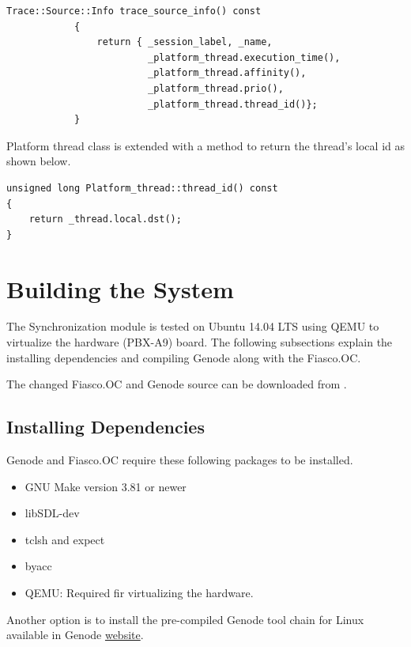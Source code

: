 \begin{lstlisting}[style=customcpp]
	Trace::Source::Info trace_source_info() const
			{
				return { _session_label, _name,
				         _platform_thread.execution_time(),
				         _platform_thread.affinity(),
						 _platform_thread.prio(),
						 _platform_thread.thread_id()};
			}
\end{lstlisting}


Platform thread class is extended with a method to return the thread's local id as shown below.

\begin{lstlisting}[style=customcpp]
unsigned long Platform_thread::thread_id() const
{
	return _thread.local.dst();
}
\end{lstlisting}

\section{Building the System}
The Synchronization module is tested on Ubuntu 14.04 LTS using QEMU to virtualize the hardware (PBX-A9) board. The following subsections explain the installing dependencies and compiling Genode along with the Fiasco.OC.

The changed Fiasco.OC and Genode source can be downloaded from \cite{git_synccode}.

\subsection{Installing Dependencies}

Genode and Fiasco.OC require these following packages to be installed.

\begin{itemize}

\item GNU Make version 3.81 or newer

\item libSDL-dev

\item tclsh and expect

\item byacc

\item QEMU: Required fir virtualizing the hardware.
\end{itemize}

Another option is to install the pre-compiled Genode tool chain for Linux available in Genode \href{http://genode.org/download/tool-chain}{website}.

